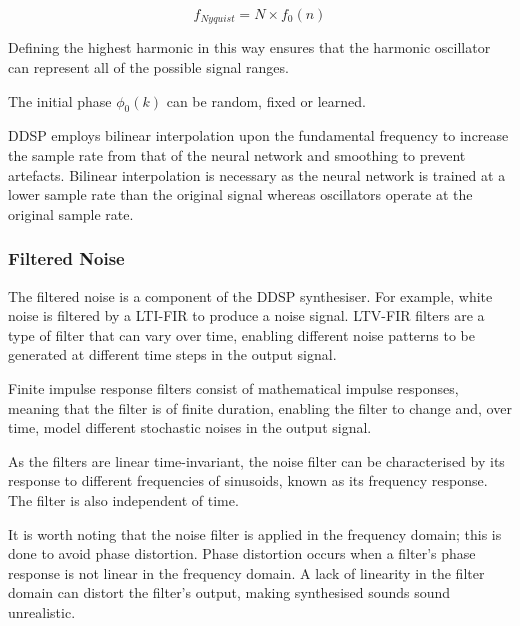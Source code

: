 \begin{equation}
    f_{Nyquist} = N \times f_0(n)
\end{equation}

Defining the highest harmonic in this way ensures that the harmonic oscillator can represent all of the possible signal ranges.

The initial phase $\phi_0(k)$ can be random, fixed or learned\cite{OriginalDDSP}.

DDSP employs bilinear interpolation upon the fundamental frequency to increase the sample rate from that of the neural network and smoothing to prevent artefacts. Bilinear interpolation is necessary as the neural network is trained at a lower sample rate than the original signal whereas oscillators operate at the original sample rate.

\vspace{0.5cm}
\vspace{0.5cm}

\subsubsection{Filtered Noise}

The filtered noise is a component of the DDSP synthesiser. For example, white noise is filtered by a \acrfull{LTI-FIR} to produce a noise signal. LTV-FIR filters are a type of filter that can vary over time, enabling different noise patterns to be generated at different time steps in the output signal.

Finite impulse response filters consist of mathematical impulse responses, meaning that the filter is of finite duration, enabling the filter to change and, over time, model different stochastic noises in the output signal.

As the filters are linear time-invariant, the noise filter can be characterised by its response to different frequencies of sinusoids, known as its frequency response. The filter is also independent of time.

It is worth noting that the noise filter is applied in the frequency domain; this is done to avoid phase distortion. Phase distortion occurs when a filter's phase response is not linear in the frequency domain. A lack of linearity in the filter domain can distort the filter's output, making synthesised sounds sound unrealistic.

